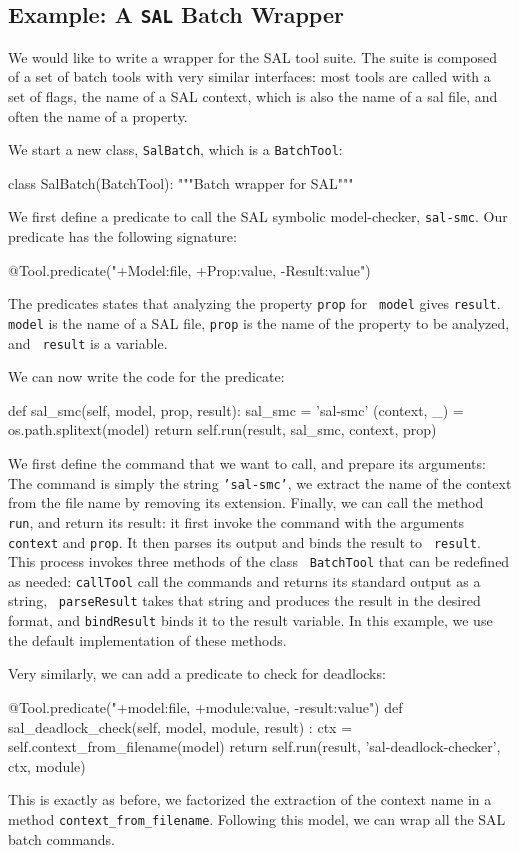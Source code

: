 \documentclass{article}
\begin{document}
\subsection{Example: A {\tt SAL} Batch Wrapper}

We would like to write a wrapper for the SAL tool suite. The suite is
composed of a set of batch tools with very similar interfaces: most
tools are called with a set of flags, the name of a SAL context, which
is also the name of a sal file, and often the name of a property.

We start a new class, {\tt SalBatch}, which is a {\tt BatchTool}:
\begin{pythoncode}
class SalBatch(BatchTool):
  """Batch wrapper for SAL"""
\end{pythoncode}

We first define a predicate to call the SAL symbolic model-checker,
{\tt sal-smc}. Our predicate has the following signature:
\begin{pythoncode}
  @Tool.predicate("+Model:file, +Prop:value, -Result:value")
\end{pythoncode}
The predicates states that analyzing the property {\tt prop} for {\tt
  model} gives {\tt result}. {\tt model} is the name of a SAL file,
{\tt prop} is the name of the property to be analyzed, and {\tt
  result} is a variable. 

We can now write the code for the predicate:
\begin{pythoncode}
  def sal_smc(self, model, prop, result):
    sal_smc = 'sal-smc'
    (context, _) = os.path.splitext(model)
    return self.run(result, sal_smc, context, prop)
\end{pythoncode}
We first define the command that we want to call, and prepare its
arguments: The command is simply the string {\tt 'sal-smc'}, we
extract the name of the context from the file name by removing its
extension. Finally, we can call the method {\tt run}, and return its
result: it first invoke the command with the arguments {\tt context}
and {\tt prop}. It then parses its output and binds the result to {\tt
  result}. This process invokes three methods of the class {\tt
  BatchTool} that can be redefined as needed: {\tt callTool} call the
commands and returns its standard output as a string, {\tt
  parseResult} takes that string and produces the result in the
desired format, and {\tt bindResult} binds it to the result
variable. In this example, we use the default implementation of these
methods.

Very similarly, we can add a predicate to check for deadlocks:
\begin{pythoncode}
@Tool.predicate("+model:file, +module:value, -result:value")
def sal_deadlock_check(self, model, module, result) :
  ctx = self.context_from_filename(model)
  return self.run(result, 'sal-deadlock-checker', ctx, module)
\end{pythoncode}
This is exactly as before, we factorized the extraction of the context
name in a method {\tt context\_from\_filename}. Following this model,
we can wrap all the SAL batch commands.
\end{document}
